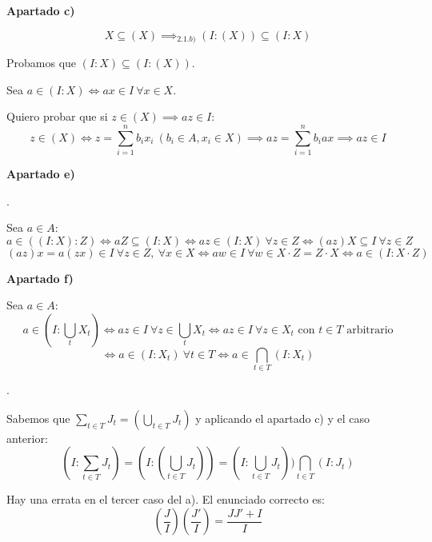 \documentclass[openany]{book}
\begin{document}
\setcounter{ex}{0}
\begin{exercise}$  $

    \begin{flushright}
        \textbf{Apartado c)}
    \end{flushright}
    $$ X \subseteq  (X) \implies_{2.1.b)} (I: (X)) \subseteq  (I:X) $$

    Probamos que $ (I:X) \subseteq  (I:(X)) $.

    Sea $ a \in (I:X) \iff ax \in I\ \forall x \in X $.

    Quiero probar que si $ z \in (X) \implies az \in I $:
    $$ z \in (X) \iff z = \sum\limits_{i=1}^{n}b_ix_i\ (b_i \in A,x_i \in X) \implies az = \sum\limits_{i=1}^{n}b_iax \implies az \in I$$


    \begin{flushright}
        \textbf{Apartado e)}
    \end{flushright}
    
    .

    Sea $ a \in A $:
    $$ a \in ((I:X):Z) \iff aZ \subseteq  (I:X) \iff az \in (I:X)\ \forall z \in Z \iff (az)X \subseteq I\ \forall  z \in Z  $$
    $$ (az)x = a(zx) \in I\ \forall z \in Z,\ \forall x \in X \iff aw \in I\ \forall w \in X\cdot Z = Z\cdot X \iff a \in (I:X\cdot Z)$$

    \begin{flushright}
        \textbf{Apartado f)}
    \end{flushright}
    Sea $ a \in A $:
    $$ a \in (I: \bigcup_{t} X_{t}) \iff az \in I\ \forall  z \in \bigcup_{t}X_{t}\iff az \in I\ \forall z \in X_{t} \text{ con }t \in T \text{ arbitrario} $$
    $$ \iff a \in (I:X_{t})\ \forall t \in T \iff a \in \bigcap_{t \in T} (I:X_{t})$$

    .

    Sabemos que $ \sum\limits_{t \in T}^{} J_{t} = \left( \bigcup_{t \in T}J_{t} \right) $ y aplicando el apartado c) y el caso anterior:
    $$ \left(I: \sum\limits_{t \in T}^{} J_{t}\right) = \left(I : ( \bigcup_{t \in T} J_{t})\right) = \left( I : \bigcup_{t \in T} J_{t} \right) ) \bigcap_{t \in T}(I:J_{t}) $$




\end{exercise}

\begin{exercise}
    Hay una errata en el tercer caso del a). El enunciado correcto es:
    $$ \left(\dfrac{J}{I}\right) \left(\dfrac{J'}{I}\right) = \dfrac{JJ'+I}{I} $$


\end{exercise}
\end{document}
